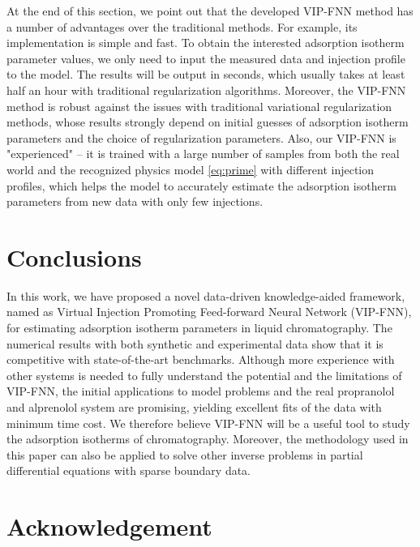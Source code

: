 \documentclass[thmsa,onecolumn,12pt]{article}%
\begin{document}
At the end of this section, we point out that the developed VIP-FNN method has a number of advantages over the traditional methods. For example, its implementation is simple and fast. To obtain the interested adsorption isotherm parameter values, we only need to input the measured data and injection profile to the model. The results will be output in seconds,  which usually takes at least half an hour with traditional regularization algorithms. Moreover, the VIP-FNN method is robust against the issues with traditional variational regularization methods, whose results strongly depend on initial guesses of adsorption isotherm parameters and the choice of regularization parameters. Also, our VIP-FNN is "experienced" -- it is trained with a large number of samples from both the real world and the recognized physics model \eqref{eq:prime} with different injection profiles, which helps the model to accurately estimate the adsorption isotherm parameters from new data with only few injections.






\section{Conclusions}
\label{sec:Con}


In this work, we have proposed a novel data-driven knowledge-aided framework, named as Virtual Injection Promoting Feed-forward Neural Network (VIP-FNN), for estimating adsorption isotherm parameters in liquid chromatography. The numerical results with both synthetic and experimental data show that it is competitive
with state-of-the-art benchmarks. Although more experience with other systems is needed to fully understand the potential and the limitations of VIP-FNN, the initial applications to model problems and the real propranolol and alprenolol system are promising, yielding excellent fits of the data with minimum time cost. We therefore believe VIP-FNN will be a useful tool to study the adsorption isotherms of chromatography. Moreover, the methodology used in this paper can also be applied to solve other inverse problems in partial differential equations with sparse boundary data.



\section{Acknowledgement}

\end{document}
